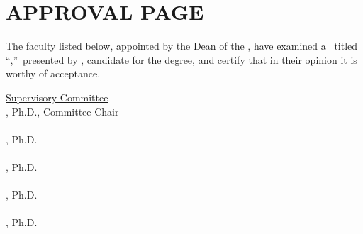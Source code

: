 \section*{\MakeUppercase{Approval Page}}

\setlength{\baselineskip}{24pt}
The faculty listed below, appointed by the Dean of the \MyUMKCSchool,
 have examined a \MakeLowercase{\ThesisOrDissertation}\ titled
``\MyThesisTitle,''~presented by \MyName, candidate
for the \MyDegree degree, and  certify that in
their opinion it is worthy of acceptance.

\vspace{0.5in}
\setlength{\baselineskip}{5pt}

\begin{center}
\underline{Supervisory Committee} \\

\vspace{0.25in}
\MyChair, Ph.D., Committee Chair \\
\MyChairDept \\

\vspace{0.25in}
\MyComOne, Ph.D.\\
\MyComOneD \\

\vspace{0.25in}
\MyComTwo, Ph.D.\\
\MyComTwoD \\

\vspace{0.25in}
\MyComThree, Ph.D.\\
\MyComThreeD \\

\vspace{0.25in}
\MyComFour, Ph.D.\\
\MyComFourD \\

\end{center} \doublespacing \newpage